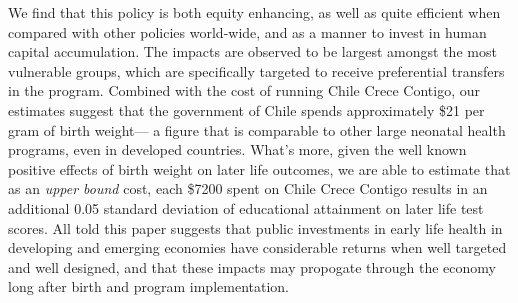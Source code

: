 \documentclass[12pt]{article}
\begin{document}
\begin{spacing}{1.4}
We find that this policy is both equity enhancing, as well as quite
efficient when compared with other policies world-wide, and as a manner
to invest in human capital accumulation.  The impacts are observed to
be largest amongst the most vulnerable groups, which are specifically
targeted to receive preferential transfers in the program. Combined with
the cost of running Chile Crece Contigo, our estimates suggest that the
government of Chile spends approximately \$21 per gram of birth weight---%
a figure that is comparable to other large neonatal health programs,
even in developed countries.  What's more, given the well known positive
effects of birth weight on later life outcomes, we are able to estimate that
as an \emph{upper bound} cost, each \$7200 spent on Chile Crece Contigo
results in an additional 0.05 standard deviation of educational attainment
on later life test scores.  All told this paper suggests that public
investments in early life health in developing and emerging economies have
considerable returns when well targeted and well designed, and that these
impacts may propogate through the economy long after birth and program
implementation.



%



\newpage

\newpage


\end{spacing}
\end{document}

